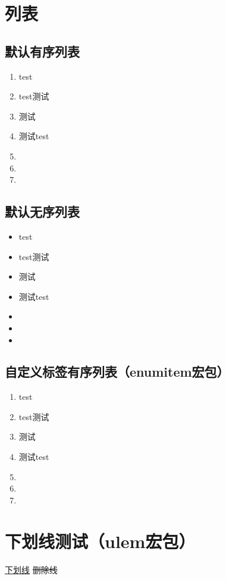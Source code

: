 \sampletext

\section{列表}
\subsection{默认有序列表}
\begin{enumerate}
    \item test
    \item test测试
    \item 测试
    \item 测试test
    \item \sampletexten
    \item \sampletext
    \item \sampletexten \sampletexten
\end{enumerate}

\subsection{默认无序列表}
\begin{itemize}
    \item test
    \item test测试
    \item 测试
    \item 测试test
    \item \sampletexten
    \item \sampletext
    \item \sampletexten \sampletexten
\end{itemize}

\subsection{自定义标签有序列表（enumitem宏包）}
\begin{enumerate}[label={Step \arabic*.}]
    \item test
    \item test测试
    \item 测试
    \item 测试test
    \item \sampletexten
    \item \sampletext
    \item \sampletexten \sampletexten
\end{enumerate}

\section{下划线测试（ulem宏包）}
\uline{下划线}
\sout{删除线}

